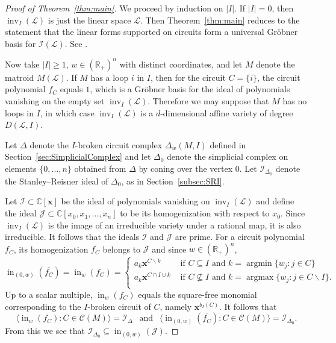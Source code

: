 \documentclass[ALCO,ThmDefs,Unicode,epreuves]{cedram}
\newcommand{\R}{\mathbb{R}}
\newcommand{\Cbb}{\mathbb{C}}
\newcommand{\I}{\mathcal{I}}
\newcommand{\J}{\mathcal{J}}
\newcommand{\cL}{\mathcal{L}}
\newcommand{\CC}{\mathcal{C}}
\newcommand{\x}{\mathbf{x}}
\newcommand{\ol}{\overline}
\DeclareMathOperator{\In}{in}
\DeclareMathOperator{\inv}{inv}
\DeclareMathOperator{\argmin}{argmin}
\DeclareMathOperator{\argmax}{argmax}
\newcommand{\reldp}{\mathrel{:}}
\begin{document}
\begin{proof}[Proof of Theorem~\ref{thm:main}] 
We proceed by induction on $|I|$. If $|I|=0$, then $\inv_I(\cL)$ is just the linear space $\cL$. 
Then Theorem~\ref{thm:main} reduces to the statement that the linear forms supported on circuits 
form a universal Gr\"obner basis for $\I(\cL)$. See \eg \cite[Prop.~1.6]{GrobnerPolytope}.

Now take $|I|\geq 1$, $w\in (\R_+)^n$ with distinct coordinates, and let $M$ denote the matroid $M(\cL)$.
If $M$ has a loop $i$ in $I$, then for the circuit $C = \{i\}$, the circuit polynomial $f_C$ equals $1$, 
which is a Gr\"obner basis for the ideal of polynomials vanishing on the empty set $\inv_I(\cL)$. 
Therefore we may suppose that $M$ has no loops in $I$, in which case $\inv_I(\cL)$ is a $d$-dimensional 
affine variety of degree $D(\cL,I)$. 

Let $\Delta$ denote the $I$-broken circuit complex $\Delta_w(M,I)$
defined in Section~\ref{sec:SimplicialComplex} and let $\Delta_0$ denote the simplicial complex on elements $\{0,\ldots , n\}$ 
obtained from $\Delta$ by coning over the vertex $0$. Let $\I_{\Delta_0}$ denote the Stanley--Reisner ideal 
of $\Delta_0$, as in Section~\ref{subsec:SRI}. 


Let $\I \subset \Cbb[\x]$ be the ideal of polynomials vanishing on $\inv_I(\cL)$ 
and define the ideal $\J\subset \Cbb[x_0, x_1, \ldots , x_n]$ to be its homogenization with respect to $x_0$. 
Since $\inv_I(\cL)$ is the image of an irreducible variety under a rational map, it is also irreducible. 
It follows that the ideals $\I$ and $\J$ are prime. 
For a circuit polynomial $f_C$, its homogenization $\ol{f_C}$ belongs to $\J$ and since $w\in (\R_+)^n$, 
\[
\In_{(0,w)}(\ol{f_C}) = \In_{w}(f_C) = \begin{cases}
 a_k \x^{C\backslash k} & \text{ if $C \subseteq I $ and $k = \argmin \{w_j: j\in C\}$ } \\ 
 a_k \x^{C\cap I\cup k} & \text{ if $C \not\subseteq I $ and $k = \argmax \{w_j: j\in C\backslash I\}$. } \\ 
\end{cases}
\]
Up to a scalar multiple, $\In_{w}(f_C)$ equals the 
square-free monomial corresponding to the $I$-broken circuit of $C$, namely $\x^{b_I(C)}$. 
It follows that 
\[
\langle \In_{w}(f_C) \reldp C \in \CC (M) \rangle = \I_{\Delta}
\ \ 
\text{ and } 
\ \ 
\langle \In_{(0,w)}(\ol{f_C}) \reldp C \in \CC (M) \rangle = \I_{\Delta_0}. 
\]
From this we see that $\I_{\Delta_0} \subseteq \In_{(0,w)}(\J)$. 



\end{proof}
\end{document}
